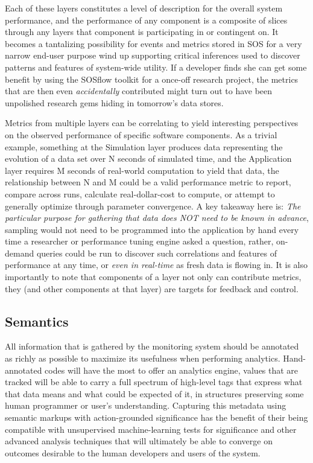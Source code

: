 Each of these layers constitutes a level of description for the
overall system performance, and the performance of any component is a
composite of slices through any layers that component is participating
in or contingent on. It becomes a tantalizing possibility for events
and metrics stored in SOS for a very narrow end-user purpose wind up
supporting critical inferences used to discover patterns and features
of system-wide utility. If a developer finds she can get some benefit
by using the SOSflow toolkit for a once-off research project, the
metrics that are then even \textit{accidentally} contributed might
turn out to have been unpolished research gems hiding in tomorrow's data
stores.

Metrics from multiple layers can be correlating to yield interesting
perspectives on the observed performance of specific software
components.  As a trivial example, something at the Simulation layer
produces data representing the evolution of a data set over N seconds
of simulated time, and the Application layer requires M seconds of
real-world computation to yield that data, the relationship between N
and M could be a valid performance metric to report, compare across
runs, calculate real-dollar-cost to compute, or attempt to generally
optimize through parameter convergence. A key takeaway here
is: \textit{The particular purpose for gathering that data does NOT
need to be known in advance}, sampling would not need to be programmed
into the application by hand every time a researcher or performance
tuning engine asked a question, rather, on-demand queries could be run
to discover such correlations and features of performance at any time,
or \textit{even in real-time} as fresh data is flowing in. It is also
importantly to note that components of a layer not only can contribute
metrics, they (and other components at that layer) are targets for
feedback and control.


\subsection{Semantics}

All information that is gathered by the monitoring system should be
annotated as richly as possible to maximize its usefulness when
performing analytics.  Hand-annotated codes will have the most to
offer an analytics engine, values that are tracked will be able to
carry a full spectrum of high-level tags that express what that data
means and what could be expected of it, in structures preserving
some human programmer or user's understanding. Capturing this metadata
using semantic markups with action-grounded significance has the
benefit of their being compatible with unsupervised machine-learning
tests for significance and other advanced analysis techniques that
will ultimately be able to converge on outcomes desirable to the human
developers and users of the system.

